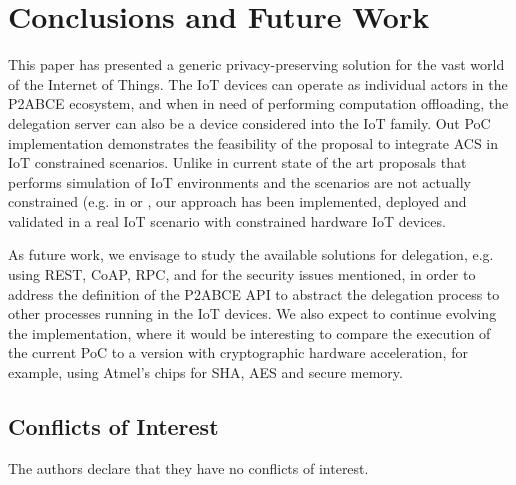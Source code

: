 \section{Conclusions and Future Work}\label{ch:conclusions}

This paper has presented a generic privacy-preserving solution for the vast world of the Internet of Things. The IoT devices can operate as individual actors in the P2ABCE ecosystem, and when in need of performing computation offloading, the delegation server can also be a device considered into the IoT family.
Out PoC implementation demonstrates the feasibility of the proposal to integrate ACS in IoT constrained scenarios. Unlike in current state of the art proposals that performs simulation of IoT environments and the scenarios are not actually constrained (e.g. in \cite{vanet} or \cite{alcaide2013anonymous}, our approach has been implemented, deployed and validated in a real IoT scenario with constrained hardware IoT devices.

As future work, we envisage to study the available solutions for delegation, e.g. using REST, CoAP, RPC, and for the security issues mentioned, in order to address the definition of the P2ABCE API to abstract the delegation process to other processes running in the IoT devices. 
We also expect to continue evolving the implementation, where it would be interesting to compare the execution of the current PoC to a version with cryptographic hardware acceleration, for example, using Atmel's chips for SHA, AES and secure memory.



\subsection*{Conflicts of Interest}

The authors declare that they have no conflicts of interest.

%
